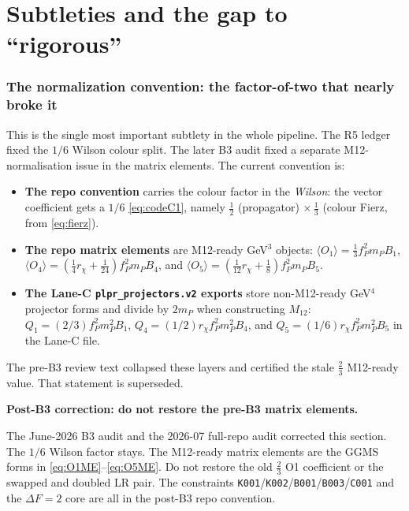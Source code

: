 \documentclass[11pt]{article}
\newenvironment{callout}[1]{%
  \par\medskip\begin{shaded}\noindent\textbf{#1}\par\smallskip}{\end{shaded}\medskip}
\newcommand{\half}{\tfrac{1}{2}}
\newcommand{\code}[1]{\texttt{#1}}
\theoremstyle{definition}
\begin{document}
\part{Subtleties and the gap to ``rigorous''}
\label{part:subtle}

\section{The normalization convention: the factor-of-two that nearly broke it}
\label{sec:r5}

This is the single most important subtlety in the whole pipeline. The R5 ledger
fixed the $1/6$ Wilson colour split. The later B3 audit fixed a separate
M12-normalisation issue in the matrix elements. The current convention is:
\begin{itemize}[leftmargin=1.4em]
\item \textbf{The repo convention} carries the colour factor in the
\emph{Wilson}: the vector coefficient gets a $1/6$ \eqref{eq:codeC1}, namely
$\half$ (propagator) $\times\,\tfrac13$ (colour Fierz, from \eqref{eq:fierz}).
\item \textbf{The repo matrix elements} are M12-ready GeV$^3$ objects:
$\langle O_1\rangle=\tfrac13 f_P^2 m_P B_1$,
$\langle O_4\rangle=(\tfrac14 r_\chi+\tfrac{1}{24})f_P^2 m_P B_4$, and
$\langle O_5\rangle=(\tfrac{1}{12} r_\chi+\tfrac18)f_P^2 m_P B_5$.
\item \textbf{The Lane-C \code{plpr\_projectors.v2} exports} store non-M12-ready
GeV$^4$ projector forms and divide by $2m_P$ when constructing $M_{12}$:
$Q_1=(2/3)f_P^2m_P^2B_1$, $Q_4=(1/2)r_\chi f_P^2m_P^2B_4$, and
$Q_5=(1/6)r_\chi f_P^2m_P^2B_5$ in the Lane-C file.
\end{itemize}
The pre-B3 review text collapsed these layers and certified the stale $\tfrac23$
M12-ready value. That statement is superseded.

\begin{callout}{Post-B3 correction: do not restore the pre-B3 matrix elements.}
The June-2026 B3 audit and the 2026-07 full-repo audit corrected this section.
The $1/6$ Wilson factor stays. The M12-ready matrix elements are the GGMS forms
in \eqref{eq:O1ME}--\eqref{eq:O5ME}. Do not restore the old $\tfrac23$ O1
coefficient or the swapped and doubled LR pair. The constraints
\code{K001}/\code{K002}/\code{B001}/\code{B003}/\code{C001} and the $\Delta F=2$
core are all in the post-B3 repo convention.
\end{callout}
\end{document}
